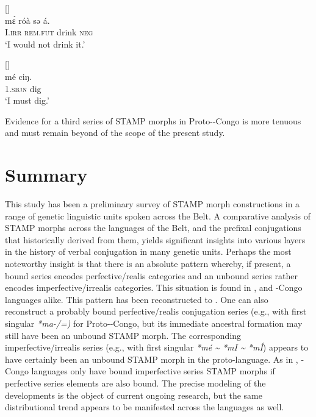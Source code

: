 \documentclass[output=paper]{langsci/langscibook}
\begin{document}
\ea\label{ex:anderson:76}
 \citep[17]{BendorSamuelEtAl1973}      []\\
\gll  m\'ɛ    róà    sə  á.\\
I.\textsc{irr}  \textsc{rem.fut}  drink  \textsc{neg}\\
\glt `I would not drink it.'
\z

\ea\label{ex:anderson:77}
  \citep[300]{Bouquiaux1970}        []\\
\gll mé    ciŋ.\\
1.\textsc{sbjn}  dig\\
\glt `I must dig.'
\z

Evidence for a third series of STAMP morphs in Proto--Congo is more tenuous and must remain beyond of the scope of the present study.

\section{Summary}\label{sec:Anderson:10}
\largerpage
This study has been a preliminary survey of STAMP morph constructions in a range of genetic linguistic units spoken across the  Belt. A comparative analysis of STAMP morphs across the languages of the  Belt, and the prefixal conjugations that historically derived from them, yields significant insights into various layers in the history of verbal conjugation in many genetic units. Perhaps the most noteworthy insight is that there is an absolute pattern whereby, if present, a bound series encodes perfective/realis categories and an unbound series rather encodes imperfective/irrealis categories. This situation is found in ,  and -Congo languages alike. This pattern has been reconstructed to  \citep{Anderson2015}. One can also reconstruct a probably bound perfective/realis conjugation series (e.g., with first singular \textit{*ma-/=)} for Proto--Congo, but its immediate ancestral formation may still have been an unbound STAMP morph. The corresponding imperfective/irrealis series (e.g., with first singular \textit{*mé {\textasciitilde} *mI {\textasciitilde} *mÍ}) appears to have certainly been an unbound STAMP morph in the proto-language. As in , -Congo languages only have bound imperfective series STAMP morphs if perfective series elements are also bound. The precise modeling of the  developments is the object of current ongoing research, but the same distributional trend appears to be manifested across the  languages as well. 
\end{document}
